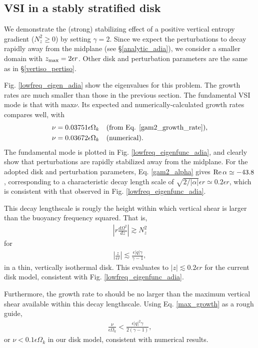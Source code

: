 \subsection{VSI in a stably stratified disk}
We demonstrate the (strong) stabilizing effect of a  
positive vertical entropy gradient ($N_z^2\geq0$) by setting $\gamma=2$.  
Since we expect the perturbations to decay rapidly
away from the midplane (see \S\ref{analytic_adia}), we consider a
smaller domain with $z_\mathrm{max} = 2\epsilon r$. 
Other disk and perturbation parameters are the same as in
\S\ref{vertiso_pertiso}.    

Fig. \ref{lowfreq_eigen_adia} show the eigenvalues for this
problem. The growth rates are much smaller than
those in the previous section. The fundamental VSI mode is that with
$\mathrm{max}\nu$. Its expected and numerically-calculated growth
rates compares well, with 
\begin{align*}
  \nu = 0.03751 \epsilon \Omega_k &\quad \text{(from
    Eq. \ref{gam2_growth_rate})},\\
  \nu = 0.03672 \epsilon \Omega_k &\quad \text{(numerical)}.
\end{align*}
The fundamental mode is plotted in Fig. \ref{lowfreq_eigenfunc_adia},
and clearly show that perturbations are rapidly stabilized away from
the midplane. For the adopted disk and perturbation parameters,
Eq. \ref{gam2_alpha} gives $\operatorname{Re}{\alpha}\simeq - 43.8$, corresponding
to a characteristic decay length scale of $\sqrt{2/|\alpha|}\epsilon r\simeq 0.2\epsilon r$,
which is consistent with that observed in  Fig. \ref{lowfreq_eigenfunc_adia}. 

This decay lengthscale is rougly the height within which
vertical shear is larger than the buoyancy frequency squared. That is,
\begin{align*}
\left|r\frac{d\Omega^2}{dz}\right|\gtrsim N_z^2
\end{align*}
for
\begin{align*}
  \left|\frac{z}{\epsilon r}\right| \lesssim \frac{\epsilon|q|\gamma}{\gamma-1},
\end{align*}
in a thin, vertically isothermal disk. This evaluates to $|z|\lesssim
0.2\epsilon r$ for the current disk model, consistent with
Fig. \ref{lowfreq_eigenfunc_adia}. 

Furthermore, the growth rate to should be no larger than the
maximum vertical shear available within this decay lengthscale. Using 
Eq. \ref{max_growth} as a rough guide, 
\begin{align}
  \frac{\nu}{\epsilon\Omega_k}<\frac{\epsilon |q|^2\gamma}{2(\gamma-1)},
\end{align}
or $\nu< 0.1\epsilon\Omega_k$ in our disk model,
consistent with numerical results. 

